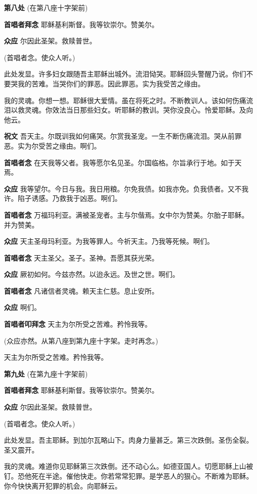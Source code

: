 \documentclass[UTF8,17pt]{ctexart}
\begin{document}
\textbf{第八处} (在第八座⼗字架前)

\textbf{⾸唱者拜念} \quad 耶稣基利斯督。我等钦崇尔。赞美尔。

\textbf{众应} \quad 尔因此圣架。救赎普世。

(⾸唱者念。使众⼈听。)

此处发显。许多妇⼥跟随吾主耶稣出城外。流泪恸哭。耶稣回头警醒乃说。你们不要哭我的苦难。当哭你们的罪恶。因此罪恶。实为我受苦之缘由。

我的灵魂。你想⼀想。耶稣很⼤爱情。虽在将死之时。不断教训⼈。该如何伤痛流泪以救灵魂。你效法当⽇那些妇⼥。听耶稣的教训。哭你没良⼼。怜爱耶稣。及向他云。

\textbf{祝⽂} \quad 吾天主。尔既训我如何痛哭。尔赏我圣宠。⼀⽣不断伤痛流泪。哭从前罪恶。实为尔受苦之缘由。啊们。

\textbf{⾸唱者念} \quad 在天我等⽗者。我等愿尔名见圣。尔国临格。尔旨承⾏于地。如于天焉。

\textbf{众应} \quad 我等望尔。今⽇与我。我⽇⽤粮。尔免我债。如我亦免。负我债者。又不我许。陷⼦诱感。乃救我于凶恶。啊们。

\textbf{⾸唱者念} \quad 万福玛利亚。满被圣宠者。主与尔偕焉。⼥中尔为赞美。尔胎⼦耶稣。并为赞美。

\textbf{众应} \quad 天主圣母玛利亚。为我等罪⼈。今祈天主。乃我等死候。啊们。

\textbf{⾸唱者念} \quad 天主圣⽗。圣⼦。圣神。吾愿其获光荣。

\textbf{众应} \quad 厥初如何。今兹亦然。以迨永远。及世之世。啊们。

\textbf{⾸唱者念} \quad 凡诸信者灵魂。赖天主仁慈。息⽌安所。

\textbf{众应} \quad 啊们。


\textbf{⾸唱者叩拜念} \quad 天主为尔所受之苦难。矜怜我等。

(众应亦然。从第八座到第九座⼗字架。⾛时再念。)

天主为尔所受之苦难。矜怜我等。

\textbf{第九处} (在第九座⼗字架前)

\textbf{⾸唱者拜念} \quad 耶稣基利斯督。我等钦崇尔。赞美尔。

\textbf{众应} \quad 尔因此圣架。救赎普世。

(⾸唱者念。使众⼈听。)

此处发显。吾主耶稣。到加尔⽡略⼭下。⾁⾝⼒量甚乏。第三次跌倒。圣伤全裂。圣⼜震开。

我的灵魂。难道你见耶稣第三次跌倒。还不动⼼么。如德亚国⼈。切愿耶稣上⼭被钉。恐他死在半途。催他快⾛。你若常常犯罪。是学恶⼈的狠⼼。不断难为耶稣。你今快快离开犯罪的机会。向耶稣云。
\end{document}
